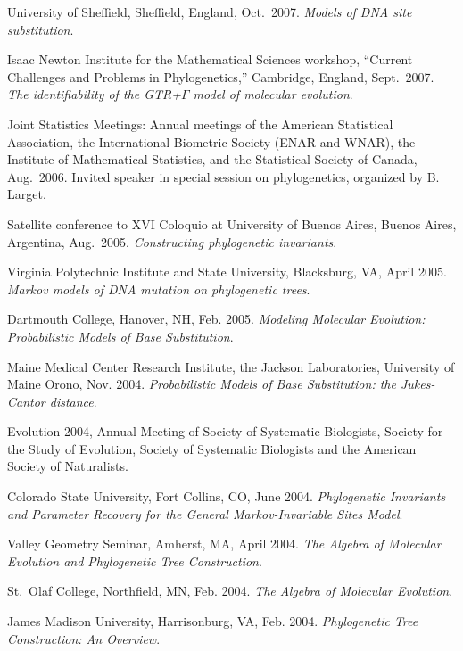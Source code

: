 \documentclass[10pt]{report}
\begin{document}
{University of Sheffield, Sheffield, England,  Oct.~2007. \emph{Models
of DNA site substitution}.

{}

Isaac Newton Institute for the Mathematical Sciences workshop,
``Current Challenges and Problems in Phylogenetics,'' Cambridge,
England, Sept.~2007. \emph{The identifiability of the GTR+$\Gamma$
model of molecular evolution}.

Joint Statistics Meetings: Annual meetings of the American
Statistical Association, the International Biometric Society (ENAR
and WNAR), the Institute of Mathematical Statistics, and the
Statistical Society of Canada, Aug.~2006.  Invited speaker in special session
on phylogenetics, organized by B. Larget.

Satellite conference to XVI Coloquio at University of Buenos Aires,
Buenos Aires, Argentina, Aug.~2005. {\it Constructing phylogenetic
invariants}.

Virginia Polytechnic Institute and State University, Blacksburg,
VA, April 2005.  \emph{Markov models of DNA mutation on
phylogenetic trees}.

Dartmouth College, Hanover, NH, Feb. 2005.  \emph{Modeling
Molecular Evolution: Probabilistic Models of Base Substitution}.

Maine Medical Center Research Institute, the Jackson Laboratories,
University of Maine Orono,
Nov. 2004. {\it Probabilistic Models of Base Substitution: the
Jukes-Cantor distance}.

Evolution 2004,
Annual Meeting of Society of Systematic Biologists,
Society for the Study of Evolution, Society of Systematic Biologists
and the American Society of Naturalists.

Colorado State University, Fort Collins, CO, June 2004.
 {\it Phylogenetic Invariants
  and Parameter Recovery for the General Markov-Invariable Sites
  Model}.

Valley Geometry Seminar, Amherst, MA, April 2004. {\it The Algebra of
Molecular Evolution and Phylogenetic Tree Construction}.

St.~Olaf College, Northfield, MN, Feb. 2004. {\it The Algebra of
Molecular Evolution}.

James Madison University, Harrisonburg, VA, Feb. 2004. {\it Phylogenetic
Tree Construction: An Overview}.

}
\end{document}
